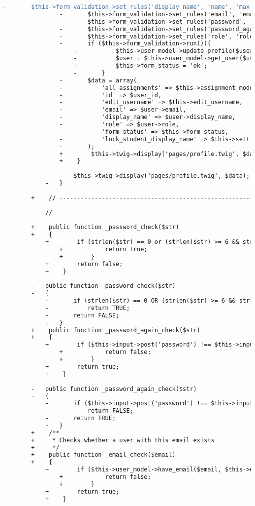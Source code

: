 \begin{lstlisting}[language=diff, caption=Perubahan pada kode Profile.php]
				-		$this->form_validation->set_rules('display_name', 'name', 'max_length[40]');
				-		$this->form_validation->set_rules('email', 'email address', 'required|max_length[40]|valid_email|callback__email_check', array('_email_check' => 'This %s already exists.'));
				-		$this->form_validation->set_rules('password', 'password', 'callback__password_check', array('_password_check' => 'The %s field must be between 6 and 200 characters in length.'));
				-		$this->form_validation->set_rules('password_again', 'password confirmation', 'callback__password_again_check', array('_password_again_check' => 'The %s field does not match the password field.'));
				-		$this->form_validation->set_rules('role', 'role', 'callback__role_check');
				-		if ($this->form_validation->run()){
					-			$this->user_model->update_profile($user_id);
					-			$user = $this->user_model->get_user($user_id);
					-			$this->form_status = 'ok';
					-		}
				-		$data = array(
				-			'all_assignments' => $this->assignment_model->all_assignments(),
				-			'id' => $user_id,
				-			'edit_username' => $this->edit_username,
				-			'email' => $user->email,
				-			'display_name' => $user->display_name,
				-			'role' => $user->role,
				-			'form_status' => $this->form_status,
				-			'lock_student_display_name' => $this->settings_model->get_setting(lock_student_display_name),
				-		);
				+        $this->twig->display('pages/profile.twig', $data);
				+    }
			
			-		$this->twig->display('pages/profile.twig', $data);
			-	}
		
		+    // ------------------------------------------------------------------------
		
		-	// ------------------------------------------------------------------------
		
		+    public function _password_check($str)
		+    {
			+        if (strlen($str) == 0 or (strlen($str) >= 6 && strlen($str) <= 200)) {
				+            return true;
				+        }
			+        return false;
			+    }
		
		-	public function _password_check($str)
		-	{
			-		if (strlen($str) == 0 OR (strlen($str) >= 6 && strlen($str) <= 200))
			-			return TRUE;
			-		return FALSE;
			-	}
		+    public function _password_again_check($str)
		+    {
			+        if ($this->input->post('password') !== $this->input->post('password_again')) {
				+            return false;
				+        }
			+        return true;
			+    }
		
		-	public function _password_again_check($str)
		-	{
			-		if ($this->input->post('password') !== $this->input->post('password_again'))
			-			return FALSE;
			-		return TRUE;
			-	}
		+    /**
		+     * Checks whether a user with this email exists
		+     */
		+    public function _email_check($email)
		+    {
			+        if ($this->user_model->have_email($email, $this->edit_username)) {
				+            return false;
				+        }
			+        return true;
			+    }
		

\end{lstlisting}
